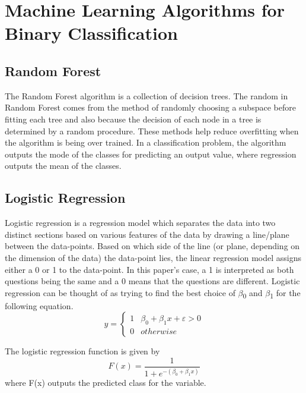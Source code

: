 \documentclass[9pt,twocolumn,twoside]{idsi}
\begin{document}
\section{Machine Learning Algorithms for Binary Classification}

\subsection{Random Forest}
The Random Forest algorithm is a collection of decision trees. The random in Random Forest comes from the method of randomly choosing a subspace before fitting each tree and also because the decision of each node in a tree is determined by a random procedure. These methods help reduce overfitting when the algorithm is being over trained. In a classification problem, the algorithm outputs the mode of the classes for predicting an output value, where regression outputs the mean of the classes.

\subsection{Logistic Regression}
Logistic regression is a regression model which separates the data into two distinct sections based on various features of the data by drawing a line/plane between the data-points. Based on which side of the line (or plane, depending on the dimension of the data) the data-point lies, the linear regression model assigns either a 0 or 1 to the data-point. In this paper's case, a 1 is interpreted as both questions being the same and a 0 means that the questions are different. 
Logistic regression can be thought of as trying to find the best choice of $\beta$\textsubscript{0} and $\beta$\textsubscript{1} for the following equation. 
\begin{equation}
{\displaystyle y={\begin{cases}1&\beta _{0}+\beta _{1}x+\varepsilon >0\\0& otherwise\end{cases}}}
\end{equation}

The logistic regression function is given by
\begin{equation}
F(x)={\frac {1}{1+e^{-(\beta _{0}+\beta _{1}x)}}}
\end{equation}
where F(x) outputs the predicted class for the variable.
\end{document}
